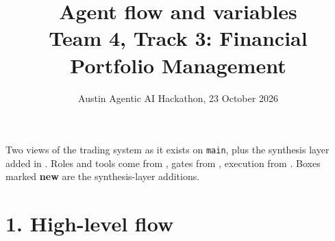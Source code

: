 \documentclass[11pt,a4paper]{article}
\title{\vspace{-1.2cm}Agent flow and variables\\[2pt]\large Team 4, Track 3: Financial Portfolio Management}
\author{Austin Agentic AI Hackathon, 23 October 2026}
\date{}
\begin{document}
\maketitle
\vspace{-0.8cm}

Two views of the trading system as it exists on \texttt{main}, plus the synthesis layer added in . Roles and tools come from , gates from , execution from . Boxes marked \textbf{new} are the synthesis-layer additions.

\section*{1. High-level flow}
\end{document}
